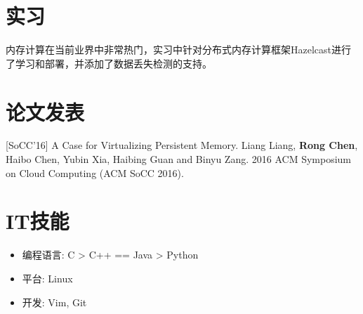 \documentclass{resume}
\begin{document}
\section{实习}
内存计算在当前业界中非常热门，实习中针对分布式内存计算框架Hazelcast进行了学习和部署，并添加了数据丢失检测的支持。

\section{论文发表}
[SoCC'16] A Case for Virtualizing Persistent Memory. Liang Liang, \textbf{Rong Chen}, Haibo Chen, Yubin Xia, Haibing Guan and Binyu Zang. 2016 ACM Symposium on Cloud Computing (ACM SoCC 2016).

\section{IT技能}
\begin{itemize}[parsep=0.5ex]
  \item 编程语言: C > C++ == Java > Python
  \item 平台: Linux
  \item 开发: Vim, Git
\end{itemize}

%
%
\end{document}
